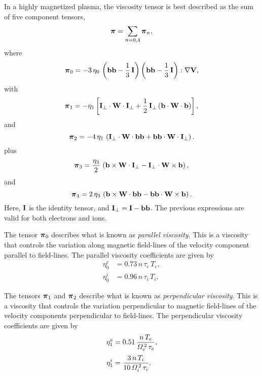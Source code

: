 \documentclass[notitlepage,12pt]{article}
\newcommand{\bpi}{\mbox{\boldmath$\pi$}}
\begin{document}
In a highly magnetized plasma, the viscosity tensor is best described as the
sum of  five component tensors,
\begin{equation}
\bpi  = \sum_{n=0,4} \bpi_n,
\end{equation}
where 
\begin{equation}
\bpi_0 = - 3\,\eta_0\,\left({\bf b}{\bf b} - \frac{1}{3}\,{\bf I}\right)
\left({\bf b}{\bf b} - \frac{1}{3}\,{\bf I}\right): \nabla {\bf V},
\end{equation}
with
\begin{equation}
\bpi_1 =- \eta_1\left[{\bf I}_\perp \cdot{\bf W}\cdot{\bf I}_\perp
+ \frac{1}{2}\,{\bf I}_\perp\,({\bf b}\cdot{\bf W}\cdot{\bf b})\right],
\end{equation}
and
\begin{equation}
\bpi_2 = -4\,\eta_1\,\left({\bf I}_\perp\cdot
{\bf W}\cdot{\bf b}{\bf b}
+ {\bf b}{\bf b}\cdot{\bf W} \cdot{\bf I}_\perp\right).
\end{equation}
plus
\begin{equation}
\bpi_3 = \frac{\eta_3}{2}\,\left( {\bf b}\times 
{\bf W}\cdot{\bf I}_\perp - {\bf I}_\perp\cdot{\bf W}\times{\bf b}
\right),
\end{equation}
and
\begin{equation}
\bpi_4 = 2\,\eta_3\,\left({\bf b} \times{\bf W} \cdot {\bf b}{\bf b}
- {\bf b}{\bf b} \cdot{\bf W} \times{\bf b}\right).
\end{equation}
Here, ${\bf I}$ is the identity tensor, and 
${\bf I}_\perp = {\bf I} - {\bf b}{\bf b}$. The previous 
expressions are valid for both electrons and ions. 

The tensor $\bpi_0$ describes what is known as {\em parallel viscosity}.
This is a viscosity that controls the variation along magnetic field-lines of the
velocity component parallel to  field-lines.
 The parallel
viscosity coefficients are given by 
\begin{align}\label{e3.89a}
\eta_0^e &= 0.73\,n\,\tau_e\,T_e,\\[0.5ex]
\eta_0^i &= 0.96\,n\,\tau_i\,T_i,\label{e3.89b}
\end{align}

The tensors $\bpi_1$ and $\bpi_2$ describe what is known
as {\em perpendicular viscosity}. This is a viscosity
that controls the variation perpendicular to magnetic field-lines
of the velocity components perpendicular to field-lines. The perpendicular
viscosity coefficients are given by
\begin{align}
\eta_1^e &= 0.51\, \frac{n\,T_e}{{\mit\Omega}_e^{\,2}\,\tau_e},\\[0.5ex]
\eta_1^i &= \frac{3\, n\,T_i}{10\,{\mit\Omega}_i^{\,2}\,\tau_i}.
\end{align}
\end{document}
